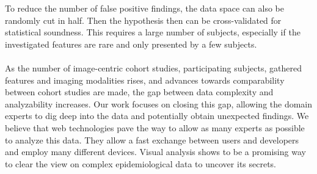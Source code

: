 \documentclass[journal]{style/vgtc} 			          %
\begin{document}
To reduce the number of false positive findings, the data space can also be randomly cut in half.
%
Then the hypothesis then can be cross-validated for statistical soundness.
%
This requires a large number of subjects, especially if the investigated features are rare and only presented by a few subjects.
%
\\\\
As the number of image-centric cohort studies, participating subjects, gathered features and imaging modalities rises, and advances towards comparability between cohort studies are made, the gap between data complexity and analyzability increases.
%
Our work focuses on closing this gap, allowing the domain experts to dig deep into the data and potentially obtain unexpected findings.
%
We believe that web technologies pave the way to allow as many experts as possible to analyze this data.
%
They allow a fast exchange between users and developers and employ many different devices.
%
Visual analysis shows to be a promising way to clear the view on complex epidemiological data to uncover its secrets.





\end{document}
